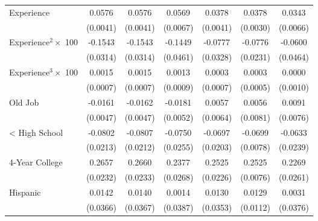 {\begin{longtable}{l*{6}{c}}
Experience          &      0.0576\sym{***}&      0.0576\sym{***}&      0.0569\sym{***}&      0.0378\sym{***}&      0.0378\sym{***}&      0.0343\sym{***}\\
                    &    (0.0041)         &    (0.0041)         &    (0.0067)         &    (0.0041)         &    (0.0030)         &    (0.0066)         \\
Experience$^2\times$ 100&     -0.1543\sym{***}&     -0.1543\sym{***}&     -0.1449\sym{***}&     -0.0777\sym{**} &     -0.0776\sym{***}&     -0.0600         \\
                    &    (0.0314)         &    (0.0314)         &    (0.0461)         &    (0.0328)         &    (0.0231)         &    (0.0464)         \\
Experience$^3\times$ 100&      0.0015\sym{**} &      0.0015\sym{**} &      0.0013         &      0.0003         &      0.0003         &      0.0000         \\
                    &    (0.0007)         &    (0.0007)         &    (0.0009)         &    (0.0007)         &    (0.0005)         &    (0.0010)         \\
Old Job             &     -0.0161\sym{***}&     -0.0162\sym{***}&     -0.0181\sym{***}&      0.0057         &      0.0056         &      0.0091         \\
                    &    (0.0047)         &    (0.0047)         &    (0.0052)         &    (0.0064)         &    (0.0081)         &    (0.0076)         \\
< High School       &     -0.0802\sym{***}&     -0.0807\sym{***}&     -0.0750\sym{***}&     -0.0697\sym{***}&     -0.0699\sym{***}&     -0.0633\sym{***}\\
                    &    (0.0213)         &    (0.0212)         &    (0.0255)         &    (0.0203)         &    (0.0078)         &    (0.0239)         \\
4-Year College      &      0.2657\sym{***}&      0.2660\sym{***}&      0.2377\sym{***}&      0.2525\sym{***}&      0.2525\sym{***}&      0.2269\sym{***}\\
                    &    (0.0232)         &    (0.0233)         &    (0.0268)         &    (0.0226)         &    (0.0076)         &    (0.0261)         \\
Hispanic            &      0.0142         &      0.0140         &      0.0014         &      0.0130         &      0.0129         &      0.0031         \\
                    &    (0.0366)         &    (0.0367)         &    (0.0387)         &    (0.0353)         &    (0.0112)         &    (0.0376)         \\

\end{longtable}}
